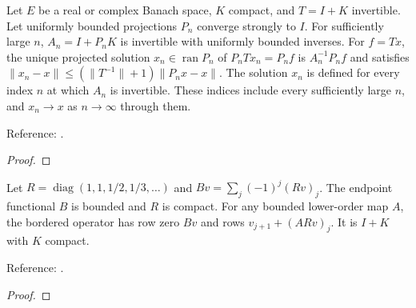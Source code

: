 \begin{theorem}
\label{thm:compact-finite-section-convergence}
\leanok
Let $E$ be a real or complex Banach space, $K$ compact, and $T=I+K$ invertible. Let uniformly bounded projections $P_n$ converge strongly to $I$. For sufficiently large $n$, $A_n=I+P_nK$ is invertible with uniformly bounded inverses. For $f=Tx$, the unique projected solution $x_n\in\operatorname{ran}P_n$ of $P_nTx_n=P_nf$ is $A_n^{-1}P_nf$ and satisfies $\|x_n-x\|\le(\|T^{-1}\|+1)\|P_nx-x\|$. The solution $x_n$ is defined for every index $n$ at which $A_n$ is invertible. These indices include every sufficiently large $n$, and $x_n\to x$ as $n\to\infty$ through them.

Reference: \cite[Section 4]{olver-townsend}.
\end{theorem}
\begin{proof}
\leanok
\end{proof}

\begin{theorem}
\label{thm:first-order-compact-preconditioner}
\leanok
Let $R=\operatorname{diag}(1,1,1/2,1/3,\ldots)$ and $Bv=\sum_j(-1)^j(Rv)_j$. The endpoint functional $B$ is bounded and $R$ is compact. For any bounded lower-order map $A$, the bordered operator has row zero $Bv$ and rows $v_{j+1}+(ARv)_j$. It is $I+K$ with $K$ compact.

Reference: \cite[Section 4.1, Lemma 4.3]{olver-townsend}.
\end{theorem}
\begin{proof}
\leanok
\end{proof}

